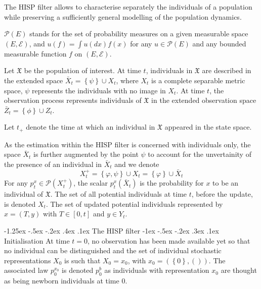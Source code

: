 \documentclass[a4paper, 11pt]{article}
\makeatletter
\newcommand{\xiaosihao}{\fontsize{12pt}{\baselineskip}\selectfont}
\renewcommand\subsection{\@startsection{subsection}{1}{\z@}%
{-1.25ex \@plus -.5ex \@minus -.2ex}%
{.4ex \@plus .1ex}%
{\normalfont\xiaosihao\CJKfamily{hei}}}
\renewcommand\subsubsection{\@startsection{subsubsection}{1}{\z@}%
{-1ex \@plus -.5ex \@minus -.2ex}%
{.3ex \@plus .1ex}%
{\normalfont\xiaosihao\CJKfamily{hei}}}
\makeatother
\begin{document}
\begin{CJK}{UTF8}{gbsn}
The HISP filter allows to characterise separately the individuals of a population while preserving a sufficiently general modelling of the population dynamics.

$\mathcal{P}(E)$   stands for the  set of probability measures on a given measurable space $(E,\mathcal{E})$, and $u(f) = \int u(dx) f(x)$ for any $u \in \mathcal{P}(E)$ and any bounded measurable function $f$ on $(E,\mathcal{E})$.

Let $\mathfrak{X}$ be the population of interest. At time $t$, individuals in $\mathfrak{X}$ are described in the extended space $\bar{X}_t = \left\{ \psi \right\} \cup X_t$, where $X_t$ is a complete separable metric space, $\psi$ represents the individuals with no image in $X_t$. At time $t$, the observation process represents individuals of $\mathfrak{X}$ in the extended observation space
$\bar{Z}_t = \left\{ \phi \right\} \cup Z_t$.


Let $t_{+}$ denote the time at which an individual in $\mathfrak{X}$ appeared in the state space.

As the estimation within the HISP filter is concerned with individuals only, the space $\bar{X}_t$ is further augmented by the point $\psi$ to account for the unvertainity of the presence of an individual in $\bar{X}_t$ and we denote
\begin{equation}
X_t^{+} = \left\{\varphi, \psi \right\} \cup X_t = \left\{\varphi \right\} \cup \bar{X}_t
\end{equation}
For any $p_t^x \in \mathcal{P}(X_t^+)$, the scalar $p_t^x(\bar{X}_t)$ is the probability for $x$ to be an individual of $\mathfrak{X}$. The set of all potential individuals at time $t$, before the update, is denoted $X_t$. The set of updated potential individuals represented by $x = (T,y)$ with $T \in [0,t] $ and $y \in Y_t$.

\subsection{The HISP filter}
\subsubsection{Initialisation}
At time $t = 0$, no observation has been made available yet so that no individual can be distinguished and the set of individual stochastic representations $X_0$ is such that $X_0 = {x_0}$, with $x_0 = (\left\{0 \right\},())$. The associated law $p_0^{x_0}$ is denoted $p_0^b$ as individuals with representation $x_0$ are thought as being newborn individuals at time $0$.


\end{CJK}
\end{document}
